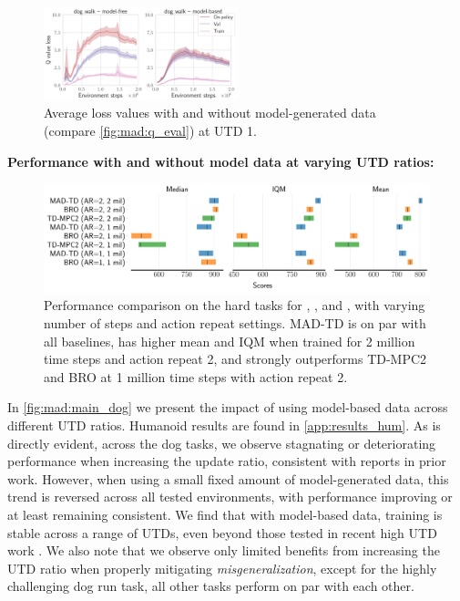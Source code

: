 \begin{figure}
    \centering
    \includegraphics[width=0.5\textwidth]{figures/mad-td/critic_loss_dog_walk_model_based_separate.pdf}
    \caption{Average loss values with and without model-generated data (compare \autoref{fig:mad:q_eval}) at UTD 1.}
    \label{fig:mad:exp_repeat}    
\end{figure}
\textbf{Performance with and without model data at varying UTD ratios:}~~~
\begin{figure}[t]
    \centering
    \includegraphics[width=1.\linewidth]{figures/mad-td/hard_rliable_comp.pdf}
    \caption{Performance comparison on the hard tasks for , , and , with varying number of steps and action repeat settings. MAD-TD is on par with all baselines, has higher mean and IQM when trained for 2 million time steps and action repeat 2, and strongly outperforms TD-MPC2 and BRO at 1 million time steps with action repeat 2.}
    \label{fig:mad:comp_baseline}
\end{figure}
In \autoref{fig:mad:main_dog} we present the impact of using model-based data across different UTD ratios.
Humanoid results are found in \autoref{app:results_hum}.
As is directly evident, across the dog tasks, we observe stagnating or deteriorating performance when increasing the update ratio, consistent with reports in prior work.
However, when using a small fixed amount of model-generated data, this trend is reversed across all tested environments, with performance improving or at least remaining consistent.
We find that with model-based data, training is stable across a range of UTDs, even beyond those tested in recent high UTD work \parencite{nauman2024bigger}.
We also note that we observe only limited benefits from increasing the UTD ratio when properly mitigating \emph{misgeneralization}, except for the highly challenging dog run task, all other tasks perform on par with each other.


